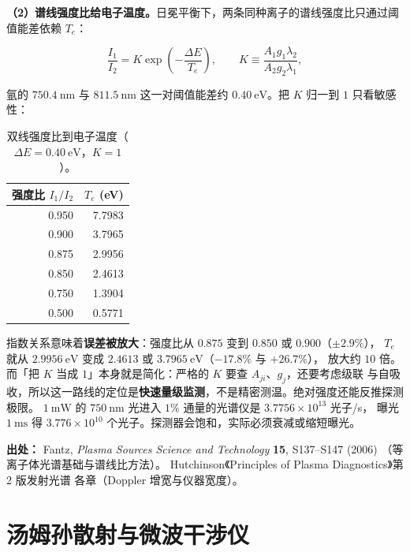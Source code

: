\textbf{（2）谱线强度比给电子温度。}日冕平衡下，两条同种离子的谱线强度比只通过阈值能差依赖 $T_e$：

\begin{equation}
  \frac{I_1}{I_2} = K\exp\!\left(-\frac{\Delta E}{T_e}\right),
  \qquad
  K \equiv \frac{A_1g_1\lambda_2}{A_2g_2\lambda_1},
  \label{eq:app-q-oes}
\end{equation}

氩的 $750.4\ \mathrm{nm}$ 与 $811.5\ \mathrm{nm}$ 这一对阈值能差约 $0.40\ \mathrm{eV}$。把 $K$ 归一到
$1$ 只看敏感性：

\begin{table}[htbp]
  \centering
  \caption{双线强度比到电子温度（$\Delta E=0.40\ \mathrm{eV}$，$K=1$）。}
  \label{tab:app-q-oes}
  \begin{tabular}{@{}rr@{}}
    \toprule
    强度比 $I_1/I_2$ & $T_e$ (eV) \\
    \midrule
    0.950 & 7.7983 \\
    0.900 & 3.7965 \\
    0.875 & 2.9956 \\
    0.850 & 2.4613 \\
    0.750 & 1.3904 \\
    0.500 & 0.5771 \\
    \bottomrule
  \end{tabular}
\end{table}

指数关系意味着\textbf{误差被放大}：强度比从 $0.875$ 变到 $0.850$ 或 $0.900$（$\pm2.9\%$），
$T_e$ 就从 $2.9956\ \mathrm{eV}$ 变成 $2.4613$ 或 $3.7965\ \mathrm{eV}$（$-17.8\%$ 与 $+26.7\%$），
放大约 $10$ 倍。而「把 $K$ 当成 $1$」本身就是简化：严格的 $K$ 要查 $A_{ji}$、$g_j$，还要考虑级联
与自吸收，所以这一路线的定位是\textbf{快速量级监测}，不是精密测温。绝对强度还能反推探测极限。
$1\ \mathrm{mW}$ 的 $750\ \mathrm{nm}$ 光进入 $1\%$ 通量的光谱仪是 $3.7756\times10^{13}$ 光子/s，
曝光 $1\ \mathrm{ms}$ 得 $3.776\times10^{10}$ 个光子。探测器会饱和，实际必须衰减或缩短曝光。

{\footnotesize
\textbf{出处：} Fantz, \emph{Plasma Sources Science and Technology} \textbf{15}, S137--S147 (2006)
（等离子体光谱基础与谱线比方法）。
Hutchinson《Principles of Plasma Diagnostics》第 2 版发射光谱
各章（Doppler 增宽与仪器宽度）。
}

\section{汤姆孙散射与微波干涉仪}
\label{sec:app-q-scatter}

